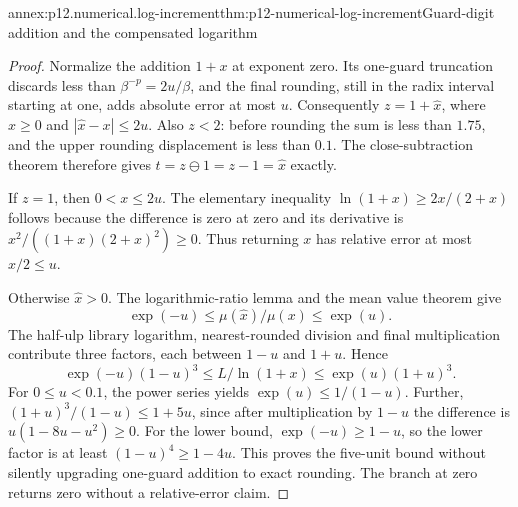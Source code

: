 \begin{annexitem}{annex:p12.numerical.log-increment}{thm:p12-numerical-log-increment}{Guard-digit addition and the compensated logarithm}
\begin{proof}
Normalize the addition \(1+x\) at exponent zero. Its one-guard
truncation discards less than \(\beta^{-p}=2u/\beta\), and the
final rounding, still in the radix interval starting at one, adds absolute
error at most \(u\). Consequently
\(z=1+\widehat x\), where \(\widehat x\geq0\) and
\(|\widehat x-x|\leq2u\). Also \(z<2\): before rounding the sum
is less than \(1.75\), and the upper rounding displacement is less
than \(0.1\). The close-subtraction theorem therefore gives
\(t=z\ominus1=z-1=\widehat x\) exactly.

If \(z=1\), then \(0<x\leq2u\). The elementary inequality
\(\ln(1+x)\geq2x/(2+x)\) follows because the difference is zero
at zero and its derivative is
\(x^2/((1+x)(2+x)^2)\geq0\). Thus returning \(x\) has relative
error at most \(x/2\leq u\).

Otherwise \(\widehat x>0\). The logarithmic-ratio lemma and the
mean value theorem give
\[
 \exp(-u)\leq\mu(\widehat x)/\mu(x)\leq\exp(u).
\]
The half-ulp library logarithm, nearest-rounded division and final
multiplication contribute three factors, each between \(1-u\) and \(1+u\).
Hence
\[
 \exp(-u)(1-u)^3\leq L/\ln(1+x)\leq\exp(u)(1+u)^3.
\]
For \(0\leq u<0.1\), the power series yields
\(\exp(u)\leq1/(1-u)\). Further,
\((1+u)^3/(1-u)\leq1+5u\), since after multiplication by
\(1-u\) the difference is \(u(1-8u-u^2)\geq0\).
For the lower bound, \(\exp(-u)\geq1-u\), so the lower factor is
at least \((1-u)^4\geq1-4u\). This proves the five-unit bound
without silently upgrading one-guard addition to exact rounding.
The branch at zero returns zero without a relative-error claim.
\end{proof}
\end{annexitem}

